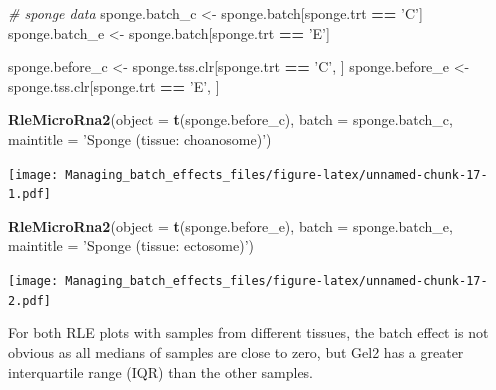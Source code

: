 \documentclass[]{book}
\newenvironment{Shaded}{\begin{snugshade}}{\end{snugshade}}
\newcommand{\KeywordTok}[1]{\textcolor[rgb]{0.13,0.29,0.53}{\textbf{#1}}}
\newcommand{\DataTypeTok}[1]{\textcolor[rgb]{0.13,0.29,0.53}{#1}}
\newcommand{\StringTok}[1]{\textcolor[rgb]{0.31,0.60,0.02}{#1}}
\newcommand{\CommentTok}[1]{\textcolor[rgb]{0.56,0.35,0.01}{\textit{#1}}}
\newcommand{\OperatorTok}[1]{\textcolor[rgb]{0.81,0.36,0.00}{\textbf{#1}}}
\newcommand{\NormalTok}[1]{#1}
\begin{document}
\begin{Shaded}
\begin{Highlighting}[]
\CommentTok{# sponge data}
\NormalTok{sponge.batch_c <-}\StringTok{ }\NormalTok{sponge.batch[sponge.trt }\OperatorTok{==}\StringTok{ 'C'}\NormalTok{]}
\NormalTok{sponge.batch_e <-}\StringTok{ }\NormalTok{sponge.batch[sponge.trt }\OperatorTok{==}\StringTok{ 'E'}\NormalTok{] }

\NormalTok{sponge.before_c <-}\StringTok{ }\NormalTok{sponge.tss.clr[sponge.trt }\OperatorTok{==}\StringTok{ 'C'}\NormalTok{, ]}
\NormalTok{sponge.before_e <-}\StringTok{ }\NormalTok{sponge.tss.clr[sponge.trt }\OperatorTok{==}\StringTok{ 'E'}\NormalTok{, ] }


\KeywordTok{RleMicroRna2}\NormalTok{(}\DataTypeTok{object =} \KeywordTok{t}\NormalTok{(sponge.before_c), }\DataTypeTok{batch =}\NormalTok{ sponge.batch_c, }
             \DataTypeTok{maintitle =} \StringTok{'Sponge (tissue: choanosome)'}\NormalTok{)}
\end{Highlighting}
\end{Shaded}

\texttt{[image: Managing\_batch\_effects\_files/figure-latex/unnamed-chunk-17-1.pdf]}

\begin{Shaded}
\begin{Highlighting}[]
\KeywordTok{RleMicroRna2}\NormalTok{(}\DataTypeTok{object =} \KeywordTok{t}\NormalTok{(sponge.before_e), }\DataTypeTok{batch =}\NormalTok{ sponge.batch_e, }
             \DataTypeTok{maintitle =} \StringTok{'Sponge (tissue: ectosome)'}\NormalTok{)}
\end{Highlighting}
\end{Shaded}

\texttt{[image: Managing\_batch\_effects\_files/figure-latex/unnamed-chunk-17-2.pdf]}

For both RLE plots with samples from different tissues, the batch effect
is not obvious as all medians of samples are close to zero, but Gel2 has
a greater interquartile range (IQR) than the other samples.
\end{document}
